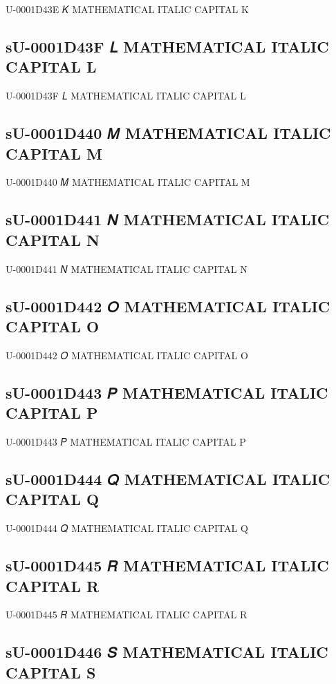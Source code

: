 U-0001D43E 𝐾 MATHEMATICAL ITALIC CAPITAL K

\subsection{sU-0001D43F 𝐿 MATHEMATICAL ITALIC CAPITAL L}

U-0001D43F 𝐿 MATHEMATICAL ITALIC CAPITAL L

\subsection{sU-0001D440 𝑀 MATHEMATICAL ITALIC CAPITAL M}

U-0001D440 𝑀 MATHEMATICAL ITALIC CAPITAL M

\subsection{sU-0001D441 𝑁 MATHEMATICAL ITALIC CAPITAL N}

U-0001D441 𝑁 MATHEMATICAL ITALIC CAPITAL N

\subsection{sU-0001D442 𝑂 MATHEMATICAL ITALIC CAPITAL O}

U-0001D442 𝑂 MATHEMATICAL ITALIC CAPITAL O

\subsection{sU-0001D443 𝑃 MATHEMATICAL ITALIC CAPITAL P}

U-0001D443 𝑃 MATHEMATICAL ITALIC CAPITAL P

\subsection{sU-0001D444 𝑄 MATHEMATICAL ITALIC CAPITAL Q}

U-0001D444 𝑄 MATHEMATICAL ITALIC CAPITAL Q

\subsection{sU-0001D445 𝑅 MATHEMATICAL ITALIC CAPITAL R}

U-0001D445 𝑅 MATHEMATICAL ITALIC CAPITAL R

\subsection{sU-0001D446 𝑆 MATHEMATICAL ITALIC CAPITAL S}

